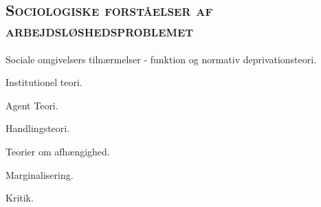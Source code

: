 










\subsection{\textsc{Sociologiske forståelser af arbejdsløshedsproblemet}}

Sociale omgivelsers tilnærmelser - funktion og normativ deprivationsteori. %

Institutionel teori. %

Agent Teori. %

Handlingsteori. %

Teorier om afhængighed. %

Marginalisering. %

Kritik. %


